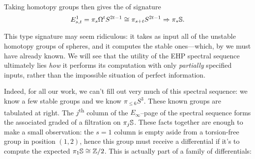 \begin{definition}
Taking homotopy groups then gives the  of signature \[E^1_{s, t} = \pi_s \Loops^t S^{2t-1} \cong \pi_{s+t} S^{2t-1} \Rightarrow \pi_* \S.\]
\end{definition}

This type signature may seem ridiculous: it takes as input all of the unstable homotopy groups of spheres, and it computes the stable ones---which, by  we must have already known.
We will see that the utility of the EHP spectral sequence ultimately lies \emph{how} it performs its computation with only \emph{partially} specified inputs, rather than the impossible situation of perfect information.

Indeed, for all our work, we can't fill out very much of this spectral sequence: we know a few stable groups and we know $\pi_{\le 6} S^3$.
These known groups are tabulated at right.
The $j$\textsuperscript{th} column of the $E_\infty$--page of the spectral sequence forms the associated graded of a filtration on $\pi_j \S$.
These facts together are enough to make a small observation: the $s = 1$ column is empty aside from a torsion-free group in position $(1, 2)$, hence this group must receive a differential if it's to compute the expected $\pi_1 \S \cong \Z/2$.
This is actually part of a family of differentials:

